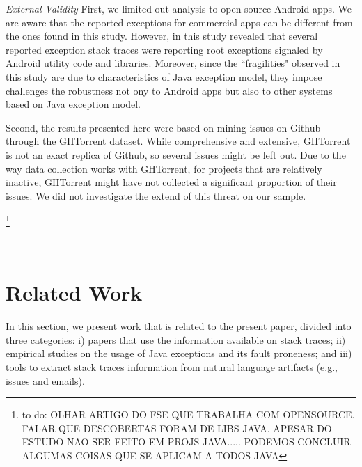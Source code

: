 \documentclass[conference]{IEEEtran}
\begin{document}
\noindent\emph{External Validity} First, we limited out analysis to open-source
Android apps. We are aware that the reported exceptions for commercial
apps can be different from the ones found in this study. However, 
in this study revealed that several reported exception stack traces 
were reporting root exceptions signaled by Android utility code and libraries. 
Moreover, since the ``fragilities" observed in this study are due to
characteristics of Java exception model, they impose challenges 
the robustness not ony to Android apps but also to other systems
 based on Java exception model.

Second, the results presented here were based on mining
issues on Github through the GHTorrent dataset. While comprehensive and
extensive, GHTorrent is not an exact replica of Github, so several issues might
be left out. Due to the way data collection works with GHTorrent, for projects
that are relatively inactive, GHTorrent might have not collected a significant
proportion of their issues. We did not investigate the extend of this threat on
our sample.

\footnote{to do: OLHAR ARTIGO DO FSE QUE TRABALHA COM OPENSOURCE.
FALAR QUE DESCOBERTAS FORAM DE LIBS JAVA. APESAR DO ESTUDO NAO SER FEITO EM PROJS JAVA.....
PODEMOS CONCLUIR ALGUMAS COISAS QUE SE APLICAM A TODOS JAVA}

\
\section{Related Work}
\label{sec:rele}

In this section, we present work that is related to the present paper, divided into
three categories: i) papers that use the information available on stack traces;
ii) empirical studies on the usage of Java exceptions and its fault proneness;
and iii) tools to extract stack traces information from natural language artifacts
(e.g., issues and emails).
\end{document}
